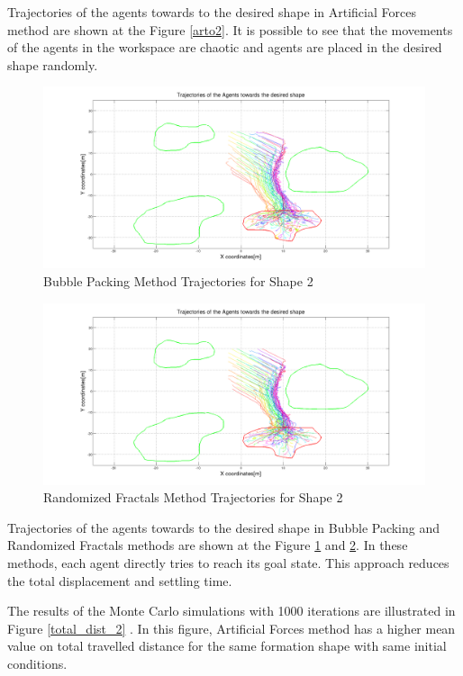 Trajectories of the agents towards to the desired shape in Artificial Forces method are shown at the Figure \ref{arto2}. It is possible to see that the movements of the agents in the workspace are chaotic and agents are placed in the desired shape randomly.

		   
\begin{figure}[H]
\caption{Bubble Packing Method Trajectories for Shape 2} \label{bubble2}
\centerline{\includegraphics[scale = 0.32]{Bubble_Trajectories_2}}
\end{figure} 	
		   
\begin{figure}[H]
\caption{Randomized Fractals Method Trajectories for Shape 2} \label{randomiz2}
\centerline{\includegraphics[scale = 0.32]{Randomized_Trajectories_2}}
\end{figure} 	
		   
Trajectories of the agents towards to the desired shape in Bubble Packing and Randomized Fractals methods are shown at the Figure \ref{bubble2} and \ref{randomiz2}. In these methods, each agent directly tries to reach its goal state. This approach reduces the total displacement and settling time.
		   
The results of the Monte Carlo simulations with 1000 iterations are illustrated in Figure \ref{total_dist_2} . In this figure, Artificial Forces method has a higher mean value on total travelled distance for the same formation shape with same initial conditions. 

